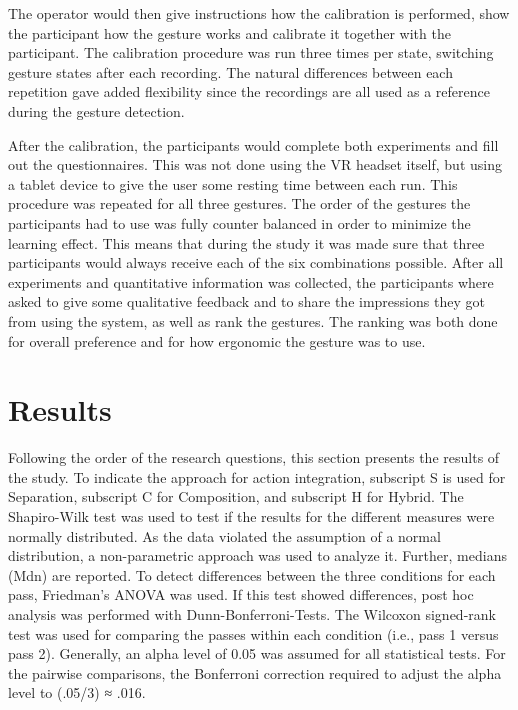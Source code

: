 The operator would then give instructions how the calibration is performed, show the participant how the gesture works and calibrate it together with the participant. The calibration procedure was run three times per state, switching gesture states after each recording. The natural differences between each repetition gave added flexibility since the recordings are all used as a reference during the gesture detection.

After the calibration, the participants would complete both experiments and fill out the questionnaires. This was not done using the VR headset itself, but using a tablet device to give the user some resting time between each run. This procedure was repeated for all three gestures. 
The order of the gestures the participants had to use was fully counter balanced in order to minimize the learning effect. This means that during the study it was made sure that three participants would always receive each of the six combinations possible. 
After all experiments and quantitative information was collected, the participants where asked to give some qualitative feedback and to share the impressions they got from using the system, as well as rank the gestures. The ranking was both done for overall preference and for how ergonomic the gesture was to use.   


\section{Results}
Following the order of the research questions, this section presents the results of the study. To
indicate the approach for action integration, subscript S is used for Separation, subscript C for
Composition, and subscript H for Hybrid. The Shapiro-Wilk test was used to test if the results
for the different measures were normally distributed. As the data violated the assumption of a
normal distribution, a non-parametric approach was used to analyze it. Further, medians (Mdn) are
reported. To detect differences between the three conditions for each pass, Friedman’s ANOVA was
used. If this test showed differences, post hoc analysis was performed with Dunn-Bonferroni-Tests.
The Wilcoxon signed-rank test was used for comparing the passes within each condition (i.e., pass
1 versus pass 2). Generally, an alpha level of 0.05 was assumed for all statistical tests. For the
pairwise comparisons, the Bonferroni correction required to adjust the alpha level to (.05/3) ≈ .016.

